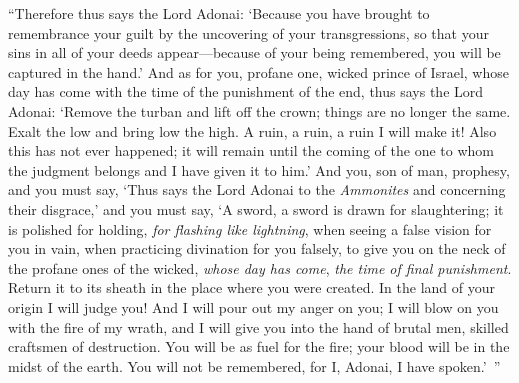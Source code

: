 \begin{biblechapter}
\verse “Therefore thus says the Lord Adonai: ‘Because you have brought to remembrance your guilt by the uncovering of your transgressions, so that your sins in all of your deeds appear—because of your being remembered, you will be captured in the hand.’
\verse And as for you, profane one, wicked prince of Israel, whose day has come with the time of the punishment of the end,
\verse thus says the Lord Adonai: ‘Remove the turban and lift off the crown; things are no longer the same. Exalt the low and bring low the high.
\verse A ruin, a ruin, a ruin I will make it! Also this has not ever happened; it will remain until the coming of the one to whom the judgment belongs and I have given it to him.’
\verse And you, son of man, prophesy, and you must say, ‘Thus says the Lord Adonai to the \textit{Ammonites} and concerning their disgrace,’ and you must say, ‘A sword, a sword is drawn for slaughtering; it is polished for holding, \textit{for flashing like lightning},
\verse when seeing a false vision for you in vain, when practicing divination for you falsely, to give you on the neck of the profane ones of the wicked, \textit{whose day has come}, \textit{the time of final punishment}.
\verse Return it to its sheath in the place where you were created. In the land of your origin I will judge you!
\verse And I will pour out my anger on you; I will blow on you with the fire of my wrath, and I will give you into the hand of brutal men, skilled craftsmen of destruction.
\verse You will be as fuel for the fire; your blood will be in the midst of the earth. You will not be remembered, for I, Adonai, I have spoken.’ ”
\end{biblechapter}

